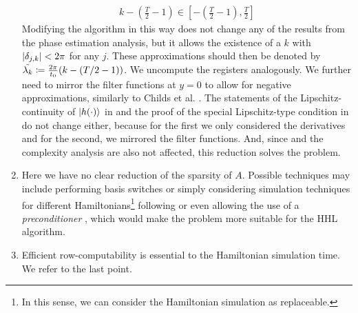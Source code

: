 \begin{enumerate}[label=\arabic*.]
    \begin{align}
        k - \left(\frac{T}{2}-1\right) \in \left[-\left(\frac{T}{2}-1\right), \frac{T}{2}\right]
    \end{align}
    Modifying the algorithm in this way does not change any of the results from the phase estimation analysis, but it allows the existence of a \(k\) with \(|\delta_{j, k}| < 2\pi\) for any \(j\). These approximations should then be denoted by \(\tilde{\lambda_k} \coloneqq \frac{2\pi}{t_0} (k - (T/2-1))\). We uncompute the registers analogously. We further need to mirror the filter functions at \(y = 0\) to allow for negative approximations, similarly to Childs et al. \cite[p. 5]{Childs2015}. The statements of the Lipschitz-continuity of \(\ket{h(\cdot)}\) in  and the proof of the special Lipschitz-type condition in  do not change either, because for the first we only considered the derivatives and for the second, we mirrored the filter functions. And, since  and the complexity analysis are also not affected, this reduction solves the problem.
    \item Here we have no clear reduction of the sparsity of \(A\). Possible techniques may include performing basis switches or simply considering simulation techniques for different Hamiltonians\footnote{In this sense, we can consider the Hamiltonian simulation as replaceable.} following \cite[p. 6]{Harrow2008} or even allowing the use of a \emph{preconditioner} \cite[p. 4]{Harrow2008}, which would make the problem more suitable for the HHL algorithm.
    \item Efficient row-computability is essential to the Hamiltonian simulation time. We refer to the last point.

\end{enumerate}
